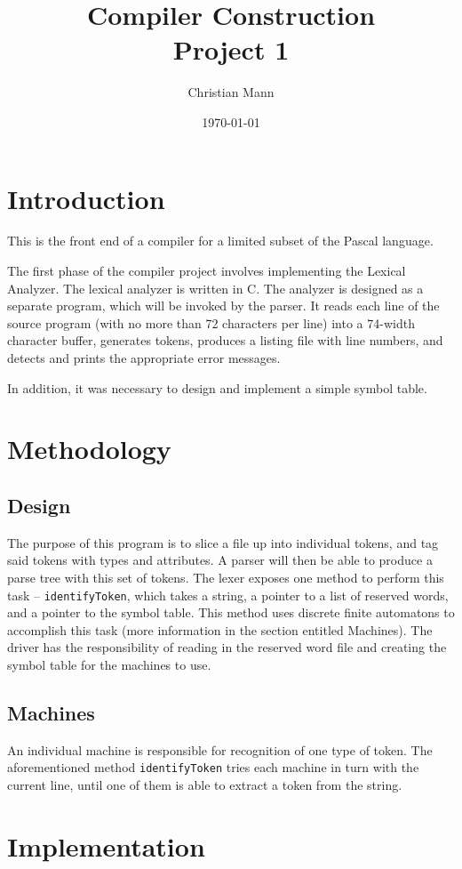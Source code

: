 \documentclass[titlepage]{article}
\author{Christian Mann}
\title{Compiler Construction \\ Project 1}
\date{\today}
\begin{document}
	\maketitle
	\tableofcontents

	\section{Introduction}
		This is the front end of a compiler for a limited subset of the Pascal language.

		The first phase of the compiler project involves implementing the Lexical Analyzer. The lexical analyzer is written in C. The analyzer is designed as a separate program, which will be invoked by the parser. It reads each line of the source program (with no more than 72 characters per line) into a 74-width character buffer, generates tokens, produces a listing file with line numbers, and detects and prints the appropriate error messages.

		In addition, it was necessary to design and implement a simple symbol table.
	\section{Methodology}
		\subsection{Design}
			The purpose of this program is to slice a file up into individual tokens, and tag said tokens with types and attributes. A parser will then be able to produce a parse tree with this set of tokens. The lexer exposes one method to perform this task -- \texttt{identifyToken}, which takes a string, a pointer to a list of reserved words, and a pointer to the symbol table. This method uses discrete finite automatons to accomplish this task (more information in the section entitled Machines).
			The driver has the responsibility of reading in the reserved word file and creating the symbol table for the machines to use.
		\subsection{Machines}
			An individual machine is responsible for recognition of one type of token. The aforementioned method \texttt{identifyToken} tries each machine in turn with the current line, until one of them is able to extract a token from the string.
	\section{Implementation}
\end{document}
